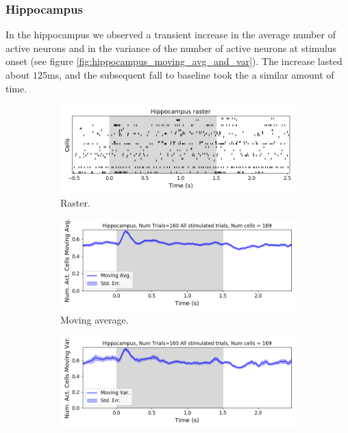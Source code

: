 \begin{figure}[p]
      \label{fig:v1_moving_avg_and_var}
    \end{figure}

    \subsubsection{Hippocampus}
    In the hippocampus we observed a transient increase in the average number of active neurons and in the variance of the number of active neurons at stimulus onset (see figure \ref{fig:hippocampus_moving_avg_and_var}). The increase lasted about $125$ms, and the subsequent fall to baseline took the a similar amount of time.

    \begin{figure}[p]
      \begin{subfigure}[h]{\linewidth}
        \includegraphics[width=\linewidth]{figures/conway_maxwell/hippocampus_raster_16.png}
        \caption{Raster.}
        \label{fig:hippocampus_raster}
      \end{subfigure}
      \begin{subfigure}[h]{\linewidth}
        \includegraphics[width=\linewidth]{figures/conway_maxwell/hippocampus_1ms_moving_avg_all_stimulated_trials.png}
        \caption{Moving average.}
        \label{fig:hippocampus_moving_avg_num_active_cells}
      \end{subfigure}
      \begin{subfigure}[h]{\linewidth}
        \includegraphics[width=\linewidth]{figures/conway_maxwell/hippocampus_1ms_moving_var_all_stimulated_trials.png}

\end{subfigure}
\end{figure}
